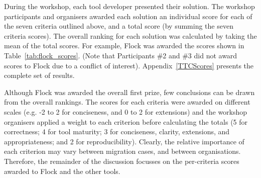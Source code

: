 During the workshop, each tool developer presented their solution. The workshop participants and organisers awarded each solution an individual score for each of the seven criteria outlined above, and a total score (by summing the seven criteria scores). The overall ranking for each solution was calculated by taking the mean of the total scores. For example, Flock was awarded the scores shown in Table~\ref{tab:flock_scores}. (Note that Participants \#2 and \#3 did not award scores to Flock due to a conflict of interest). Appendix~\ref{TTCScores} presents the complete set of results.

Although Flock was awarded the overall first prize, few conclusions can be drawn from the overall rankings. The scores for each criteria were awarded on different scales (e.g. -2 to 2 for conciseness, and 0 to 2 for extensions) and the workshop organisers applied a weight to each criterion before calculating the totals (5 for correctness; 4 for tool maturity; 3 for conciseness, clarity, extensions, and appropriateness; and 2 for reproducibility). Clearly, the relative importance of each criterion may vary between migration cases, and between organisations. Therefore, the remainder of the discussion focusses on the per-criteria scores awarded to Flock and the other tools.

